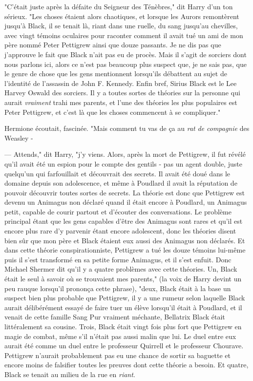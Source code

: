 "C'était juste après la défaite du Seigneur des Ténèbres," dit Harry d'un ton sérieux. "Les choses étaient alors chaotiques, et lorsque les Aurors remontèrent jusqu'à Black, il se tenait là, riant dans une ruelle, du sang jusqu'au chevilles, avec vingt témoins oculaires pour raconter comment il avait tué un ami de mon père nommé Peter Pettigrew ainsi que douze passants. Je ne dis pas que j'approuve le fait que Black n'ait pas eu de procès. Mais il s'agit de sorciers dont nous parlons ici, alors ce n'est pas beaucoup plus suspect que, je ne sais pas, que le genre de chose que les gens mentionnent lorsqu'ils débattent au sujet de l'identité de l'assassin de John F. Kennedy. Enfin bref, Sirius Black est le Lee Harvey Oswald des sorciers. Il y a toutes sortes de théories sur la personne qui aurait \emph{vraiment} trahi mes parents, et l'une des théories les plus populaires est Peter Pettigrew, et c'est là que les choses commencent à se compliquer."

Hermione écoutait, fascinée. "Mais comment tu vas de ça au \emph{rat} \emph{de compagnie} des Weasley -

--- Attends," dit Harry, "j'y viens. Alors, après la mort de Pettigrew, il fut révélé qu'il avait été un espion pour le compte des gentils - pas un agent double, juste quelqu'un qui farfouillait et découvrait des secrets. Il avait été doué dans le domaine depuis son adolescence, et même à Poudlard il avait la réputation de pouvoir découvrir toutes sortes de secrets. La théorie est donc que Pettigrew est devenu un Animagus non déclaré quand il était encore à Poudlard, un Animagus petit, capable de courir partout et d'écouter des conversations. Le problème principal étant que les gens capables d'être des Animagus sont rares et qu'il est encore plus rare d'y parvenir étant encore adolescent, donc les théories disent bien sûr que mon père et Black étaient eux aussi des Animagus non déclarés. Et dans cette théorie conspirationniste, Pettigrew a tué les douze témoins lui-même puis il s'est transformé en sa petite forme Animagus, et il s'est enfuit. Donc Michael Shermer dit qu'il y a quatre problèmes avec cette théories. Un, Black était le seul à savoir où se trouvaient mes parents," (la voix de Harry devint un peu rauque lorsqu'il prononça cette phrase), "deux, Black était à la base un suspect bien plus probable que Pettigrew, il y a une rumeur selon laquelle Black aurait délibérément essayé de faire tuer un élève lorsqu'il était à Poudlard, et il venait de cette famille Sang Pur vraiment méchante, Bellatrix Black était littéralement sa cousine. Trois, Black était vingt fois plus fort que Pettigrew en magie de combat, même s'il n'était pas aussi malin que lui. Le duel entre eux aurait été comme un duel entre le professeur Quirrell et le professeur Chourave. Pettigrew n'aurait probablement pas eu une chance de sortir sa baguette et encore moins de falsifier toutes les preuves dont cette théorie a besoin. Et quatre, Black se tenait au milieu de la rue en \emph{riant}.

